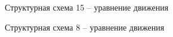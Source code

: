 \documentclass[12pt]{article}
\begin{document}
	\begin{figure}[h]
	\caption{Структурная схема 15 -- уравнение движения}
\end{figure}
	
	\begin{figure}[h]
	\caption{Структурная схема 8 -- уравнение движения}
\end{figure}	
	
\end{document}
